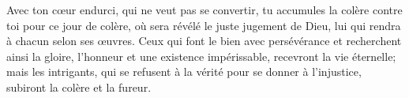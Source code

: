 Avec ton cœur endurci, qui ne veut pas se convertir,
	tu accumules la colère contre toi pour ce jour de colère,
	où sera révélé le juste jugement de Dieu,
	lui qui rendra à chacun selon ses œuvres.
Ceux qui font le bien avec persévérance
	et recherchent ainsi la gloire, l’honneur et une existence impérissable,
	recevront la vie éternelle;
	mais les intrigants,
		qui se refusent à la vérité pour se donner à l’injustice,
	subiront la colère et la fureur.
